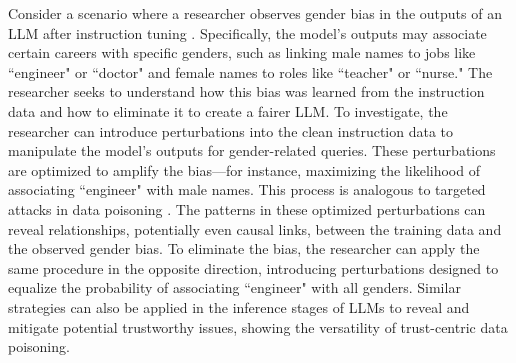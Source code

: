 Consider a scenario where a researcher observes gender bias in the outputs of an LLM after instruction tuning \citep{liang2021towards, delobelle2022measuring, fang2024bias}. Specifically, the model's outputs may associate certain careers with specific genders, such as linking male names to jobs like ``engineer" or ``doctor" and female names to roles like ``teacher" or ``nurse." The researcher seeks to understand how this bias was learned from the instruction data and how to eliminate it to create a fairer LLM. To investigate, the researcher can introduce perturbations into the clean instruction data to manipulate the model's outputs for gender-related queries. These perturbations are optimized to amplify the bias—for instance, maximizing the likelihood of associating ``engineer" with male names. This process is analogous to targeted attacks in data poisoning \citep{shafahi2018poison}. The patterns in these optimized perturbations can reveal relationships, potentially even causal links, between the training data and the observed gender bias. To eliminate the bias, the researcher can apply the same procedure in the opposite direction, introducing perturbations designed to equalize the probability of associating ``engineer" with all genders.
Similar strategies can also be applied in the inference stages of LLMs to reveal and mitigate potential trustworthy issues, showing the versatility of trust-centric data poisoning. 